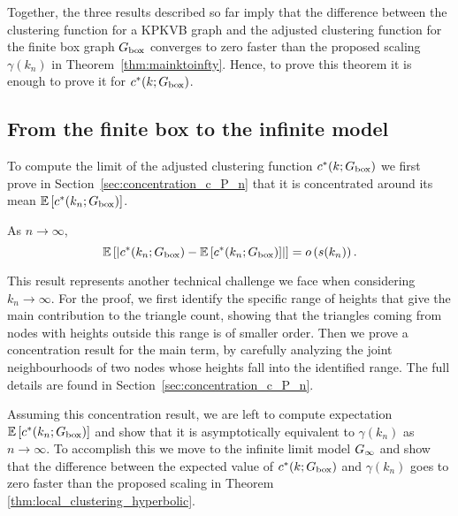 Together, the three results described so far imply that the difference between the clustering function for a KPKVB graph and the adjusted clustering function for the finite box graph $G_{\mathrm{box}}$ converges to zero faster than the proposed scaling $\gamma(k_n)$ in Theorem~\ref{thm:mainktoinfty}. Hence, to prove this theorem it is enough to prove it for $c^\ast(k; G_{\mathrm{box}})$. 

\subsection{From the finite box to the infinite model}

To compute the limit of the adjusted clustering function $c^\ast(k; G_{\mathrm{box}})$ we first prove in Section~\ref{sec:concentration_c_P_n} that it is concentrated around its mean $\mathbb{E}\left[c^\ast(k_n; G_{\mathrm{box}})\right]$.


\begin{proposition}\label{prop:concentration_local_clustering_P_n}
As $n \to \infty$,
\[
	\mathbb{E}\left[\left|c^\ast(k_n; G_{\mathrm{box}}) - \mathbb{E}\left[c^\ast(k_n; G_{\mathrm{box}})\right]\right|\right] = o\left(s(k_n)\right).
\]
\end{proposition}

This result represents another technical challenge we face when considering $k_n \to \infty$. For the proof, we first identify the specific range of heights that give the main contribution to the triangle count, showing that the triangles coming from nodes with heights outside this range is of smaller order. Then we prove a concentration result for the main term, by carefully analyzing the joint neighbourhoods of two nodes whose heights fall into the identified range. The full details are found in Section~\ref{sec:concentration_c_P_n}.

Assuming this concentration result, we are left to compute expectation $\mathbb{E}\left[c^\ast(k_n; G_{\mathrm{box}})\right]$ and show that it is asymptotically equivalent to $\gamma(k_n)$ as $n \to \infty$. To accomplish this we move to the infinite limit model $G_{\infty}$ and show that the difference between the expected value of $c^\ast(k;G_{\mathrm{box}})$ and $\gamma(k_n)$ goes to zero faster than the proposed scaling in Theorem \ref{thm:local_clustering_hyperbolic}.

